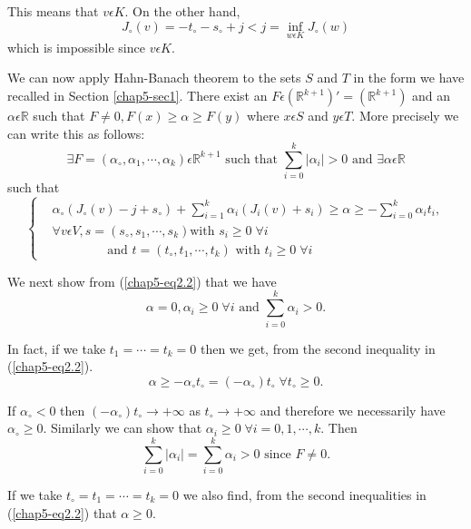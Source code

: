This means that $v \epsilon K$. On the other hand,
$$
J_{\circ}(v) = -t_{\circ} -s_{\circ} + j < j = \inf_{w \epsilon K} J_{\circ}(w)
$$
which is impossible since $v \epsilon K$.

We can now apply Hahn-Banach theorem to the sets $S$ and $T$ in the form we have recalled in Section \ref{chap5-sec1}. There exist an $F \epsilon (\mathbb{R}^{k+1})' = (\mathbb{R}^{k+1})$ and an $\alpha \epsilon \mathbb{R}$ such that $F \neq 0, F(x) \geq \alpha \geq F(y)$ where $x \epsilon S$ and $y \epsilon T$. More precisely we can write this as follows:
$$
\exists F = (\alpha_{\circ}, \alpha_{1}, \cdots, \alpha_{k}) \epsilon \mathbb{R}^{k+1} \text{ such that } \sum_{i=0}^{k} |\alpha_{i}| > 0 \text{ and } \exists \alpha \epsilon \mathbb{R}
$$
such that
\begin{equation*}
\begin{cases}
& \alpha_{\circ} (J_{\circ}(v) - j+s_{\circ}) +\sum_{i=1}^{k} \alpha_{i} (J_{i}(v) + s_{i}) \geq \alpha \geq - \sum_{i=0}^{k} \alpha_{i} t_{i},\\
& \forall v \epsilon V, s = (s_{\circ}, s_{1}, \cdots, s_{k}) \text{
    with } s_{i} \geq 0 \; \forall i\\ 
&\qquad\qquad\text{ and } t = (t_{\circ}, t_{1}, \cdots, t_{k}) \text{ with } t_{i} \geq 0 \; \forall i\tag{2.2}\label{chap5-eq2.2}
\end{cases}
\end{equation*}

We next show from (\ref{chap5-eq2.2}) that we have
\begin{equation*}
\alpha = 0, \alpha_{i} \geq 0 \; \forall i \text{ and } \sum_{i=0}^{k} \alpha_{i} > 0.\tag{2.3}\label{chap5-eq2.3}
\end{equation*}

In fact, if we take $t_{1} = \cdots = t_{k} = 0$ then we get, from the second inequality in (\ref{chap5-eq2.2}).
$$
\alpha \geq - \alpha_{\circ} t_{\circ} = (-\alpha_{\circ}) t_{\circ} \; \forall t_{\circ} \geq 0.
$$\pageoriginale

If $\alpha_{\circ} < 0$ then $(-\alpha_{\circ}) t_{\circ} \to + \infty$ as $t_{\circ} \to + \infty$ and therefore we necessarily have $\alpha_{\circ} \geq 0$. Similarly we can show that $\alpha_{i} \geq 0 \; \forall i = 0, 1, \cdots, k$. Then
$$
\sum_{i=0}^{k} |\alpha_{i}| = \sum_{i=0}^{k} \alpha_{i} > 0 \text{ since } F \neq 0.
$$

If we take $t_{\circ} = t_{1} = \cdots = t_{k} = 0$ we also find, from the second inequalities in (\ref{chap5-eq2.2}) that $\alpha \geq 0$.

